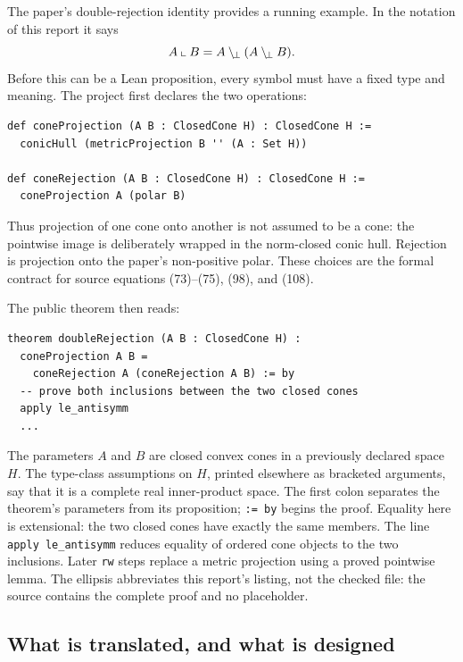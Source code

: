 \documentclass[11pt,a4paper]{article}
\begin{document}
The paper's double-rejection identity provides a running example. In the
notation of this report it says
\[
  A\mathbin{\llcorner} B=A\mathbin{\backslash_{\!\perp}}(A\mathbin{\backslash_{\!\perp}} B).
\]
Before this can be a Lean proposition, every symbol must have a fixed type and
meaning. The project first declares the two operations:

\begin{lstlisting}[style=leanstyle,language={},caption={Definitions behind the running example, with a helper name inlined.}]
def coneProjection (A B : ClosedCone H) : ClosedCone H :=
  conicHull (metricProjection B '' (A : Set H))

def coneRejection (A B : ClosedCone H) : ClosedCone H :=
  coneProjection A (polar B)
\end{lstlisting}

Thus projection of one cone onto another is not assumed to be a cone: the
pointwise image is deliberately wrapped in the norm-closed conic hull.
Rejection is projection onto the paper's non-positive polar. These choices are
the formal contract for source equations (73)--(75), (98), and (108).

The public theorem then reads:

\begin{lstlisting}[style=leanstyle,language={},caption={The public Lean endpoint for double rejection.}]
theorem doubleRejection (A B : ClosedCone H) :
  coneProjection A B =
    coneRejection A (coneRejection A B) := by
  -- prove both inclusions between the two closed cones
  apply le_antisymm
  ...
\end{lstlisting}

The parameters \(A\) and \(B\) are closed convex cones in a previously declared
space \(H\). The type-class assumptions on \(H\), printed elsewhere as bracketed
arguments, say that it is a complete real inner-product space. The first colon
separates the theorem's parameters from its proposition; \texttt{:= by} begins
the proof. Equality here is extensional: the two closed cones have exactly the
same members. The line \texttt{apply le\_antisymm} reduces equality of ordered
cone objects to the two inclusions. Later \texttt{rw} steps replace a metric
projection using a proved pointwise lemma. The ellipsis abbreviates this report's
listing, not the checked file: the source contains the complete proof and no
placeholder.

\subsection{What is translated, and what is designed}
\end{document}
